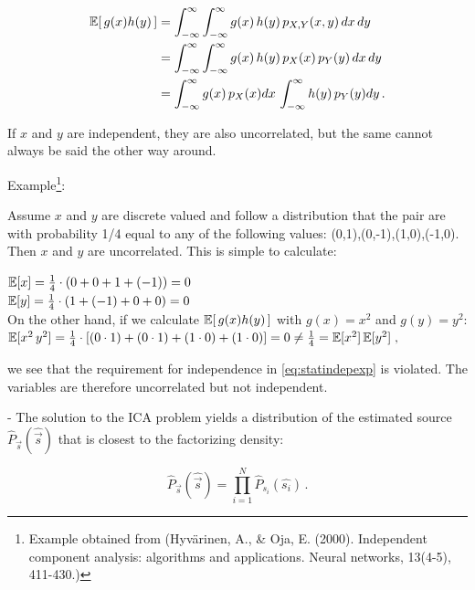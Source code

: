 \begin{align}
\mathbb{E}  \lbrack \, g(x) h(y) \, \rbrack &= \int_{-\infty}^{\infty} \int_{-\infty}^{\infty} g(x) \, h(y) \, p_{X,Y}(x,y) \, dx \, dy \\
&= \int_{-\infty}^{\infty} \int_{-\infty}^{\infty} g(x) \, h(y)  \, p_X(x) \, p_Y(y) \, dx \, dy \\
&= \int_{-\infty}^{\infty}  g(x) \, p_X(x) dx\, \int_{-\infty}^{\infty} h(y) \, p_Y(y) dy
\,.
\end{align}

If $x$ and $y$ are independent, they are also uncorrelated, but the same cannot always be said the other way around.

Example\footnote{Example obtained from (Hyv\"arinen, A., \& Oja, E. (2000). Independent component analysis: algorithms and applications. Neural networks, 13(4-5), 411-430.)}:

Assume $x$ and $y$ are discrete valued and follow a distribution that the pair are with probability 1/4 equal to any of the following
values: (0,1),(0,-1),(1,0),(-1,0). Then $x$ and $y$ are uncorrelated. This is simple to calculate:

$\mathbb{E} \lbrack x \rbrack = \frac{1}{4} \cdot (0 + 0 + 1 + (-1)) = 0$\\[2mm]
$\mathbb{E} \lbrack y \rbrack = \frac{1}{4} \cdot (1 + (-1) + 0 + 0) = 0$\\

On the other hand, if we calculate $\mathbb{E}  \lbrack \, g(x) h(y) \, \rbrack$ with $g(x)=x^2$ and $g(y)=y^2$:\\

$\mathbb{E} \lbrack x^2 \, y^2 \rbrack 
= \frac{1}{4} \cdot \lbrack (0\cdot1) + (0\cdot1) + (1\cdot0) + (1\cdot0) \rbrack = 0 
\ne \frac{1}{4} = \mathbb{E} \lbrack x^2 \rbrack \, \mathbb{E} \lbrack y^2 \rbrack \;,$

we see that the requirement for independence in \eqref{eq:statindepexp} is violated. The variables are therefore uncorrelated but not independent.

\clearpage


- The solution to the ICA problem yields a distribution of the estimated source $\widehat{P}_{\vec s}(\widehat{\vec s})$ that is closest to the factorizing density:

\begin{equation}
\label{eq:facts}
\widehat{P}_{\vec s}(\widehat{\vec s}) = \prod_{i=1}^{N} \widehat{P}_{s_i}(\widehat{s_i})  \,.
\end{equation}

